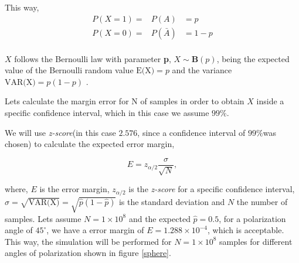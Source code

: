This way,
\begin{eqnarray}
		P(X=1) =& P(A) & = p \nonumber\\
		P(X=0) =&P(\bar{A})&=1-p  \nonumber\\
\end{eqnarray}

$X$ follows the Bernoulli law with parameter \textbf{p}, $X \sim \mathbf{B}(p)$, being the expected value of the Bernoulli random value $\textrm{E(X)}=p$ and the variance $\textrm{VAR(X)}=p(1-p)$ \cite{probabilitySheldon}.

Lets calculate the margin error for N of samples in order to obtain $X$ inside a specific confidence interval, which in this case we assume $99\%$.

We will use \textit{z-score}(in this case $2.576$, since a confidence interval of $99\%$was chosen) to calculate the expected error margin,

\begin{equation}\label{eq:marginerror}
  E = z_{\alpha/2}\frac{\sigma}{\sqrt{N}},
  \nonumber
\end{equation}

where, $E$ is the error margin, $z_{\alpha/2}$ is the \textit{z-score} for a specific confidence interval, $\sigma = \sqrt{\textrm{VAR(X})} = \sqrt{\hat{p}(1-\hat{p})}$ is the standard deviation and $N$ the number of samples. Lets assume $N=1 \times 10^{8}$ and the expected $\hat{p} = 0.5$, for a polarization angle of $45^{\circ}$, we have a error margin of $E = 1.288 \times 10^{-4}$, which is acceptable. This way, the simulation will be performed for $N=1 \times 10^{8}$ samples for different angles of polarization shown in figure \ref{sphere}.

